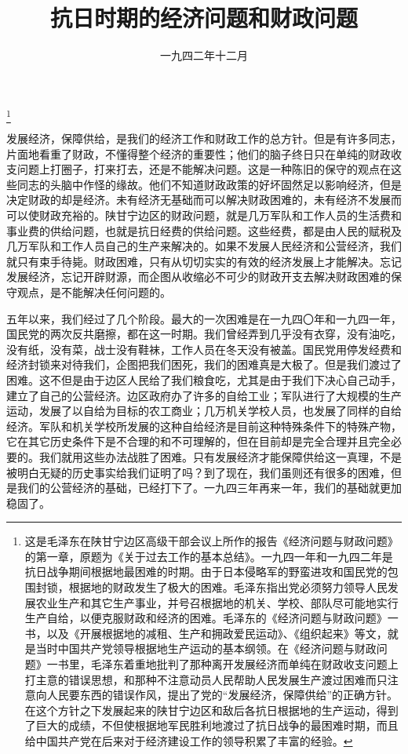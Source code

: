 
\title{抗日时期的经济问题和财政问题}
\date{一九四二年十二月}
\thanks{这是毛泽东在陕甘宁边区高级干部会议上所作的报告《经济问题与财政问题》的第一章，原题为《关于过去工作的基本总结》。一九四一年和一九四二年是抗日战争期间根据地最困难的时期。由于日本侵略军的野蛮进攻和国民党的包围封锁，根据地的财政发生了极大的困难。毛泽东指出党必须努力领导人民发展农业生产和其它生产事业，并号召根据地的机关、学校、部队尽可能地实行生产自给，以便克服财政和经济的困难。毛泽东的《经济问题与财政问题》一书，以及《开展根据地的减租、生产和拥政爱民运动》、《组织起来》等文，就是当时中国共产党领导根据地生产运动的基本纲领。在《经济问题与财政问题》一书里，毛泽东着重地批判了那种离开发展经济而单纯在财政收支问题上打主意的错误思想，和那种不注意动员人民帮助人民发展生产渡过困难而只注意向人民要东西的错误作风，提出了党的“发展经济，保障供给”的正确方针。在这个方针之下发展起来的陕甘宁边区和敌后各抗日根据地的生产运动，得到了巨大的成绩，不但使根据地军民胜利地渡过了抗日战争的最困难时期，而且给中国共产党在后来对于经济建设工作的领导积累了丰富的经验。}
\maketitle


发展经济，保障供给，是我们的经济工作和财政工作的总方针。但是有许多同志，片面地看重了财政，不懂得整个经济的重要性；他们的脑子终日只在单纯的财政收支问题上打圈子，打来打去，还是不能解决问题。这是一种陈旧的保守的观点在这些同志的头脑中作怪的缘故。他们不知道财政政策的好坏固然足以影响经济，但是决定财政的却是经济。未有经济无基础而可以解决财政困难的，未有经济不发展而可以使财政充裕的。陕甘宁边区的财政问题，就是几万军队和工作人员的生活费和事业费的供给问题，也就是抗日经费的供给问题。这些经费，都是由人民的赋税及几万军队和工作人员自己的生产来解决的。如果不发展人民经济和公营经济，我们就只有束手待毙。财政困难，只有从切切实实的有效的经济发展上才能解决。忘记发展经济，忘记开辟财源，而企图从收缩必不可少的财政开支去解决财政困难的保守观点，是不能解决任何问题的。

五年以来，我们经过了几个阶段。最大的一次困难是在一九四〇年和一九四一年，国民党的两次反共磨擦，都在这一时期。我们曾经弄到几乎没有衣穿，没有油吃，没有纸，没有菜，战士没有鞋袜，工作人员在冬天没有被盖。国民党用停发经费和经济封锁来对待我们，企图把我们困死，我们的困难真是大极了。但是我们渡过了困难。这不但是由于边区人民给了我们粮食吃，尤其是由于我们下决心自己动手，建立了自己的公营经济。边区政府办了许多的自给工业；军队进行了大规模的生产运动，发展了以自给为目标的农工商业；几万机关学校人员，也发展了同样的自给经济。军队和机关学校所发展的这种自给经济是目前这种特殊条件下的特殊产物，它在其它历史条件下是不合理的和不可理解的，但在目前却是完全合理并且完全必要的。我们就用这些办法战胜了困难。只有发展经济才能保障供给这一真理，不是被明白无疑的历史事实给我们证明了吗？到了现在，我们虽则还有很多的困难，但是我们的公营经济的基础，已经打下了。一九四三年再来一年，我们的基础就更加稳固了。

